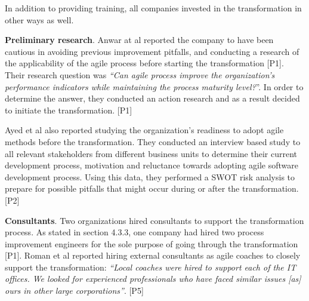 In addition to providing training, all companies invested in the
transformation in other ways as well.

{\bfseries Preliminary research}. Anwar at al reported the company
to have been cautious in avoiding previous improvement pitfalls,
and conducting a research of the applicability of the agile process
before starting the transformation [P1]. Their research question was
\textit{``Can agile process improve the organization's performance
indicators while maintaining the process maturity level?}''. In order to
determine the answer, they conducted an action research and as a result
decided to initiate the transformation. [P1]

Ayed et al also reported studying the organization's readiness to adopt
agile methods before the transformation. They conducted an interview
based study to all relevant stakeholders from different business
units to determine their current development process, motivation and
reluctance towards adopting agile software development process. Using
this data, they performed a SWOT risk analysis to prepare for possible
pitfalls that might occur during or after the transformation. [P2]

{\bfseries Consultants}. Two organizations hired consultants to support
the transformation process. As stated in section 4.3.3, one company had
hired two process improvement engineers for the sole purpose of going
through the transformation [P1]. Roman et al reported hiring external
consultants as agile coaches to closely support the transformation:
\textit{``Local coaches were hired to support each of the IT offices. We
looked for experienced professionals who have faced similar issues [as]
ours in other large corporations''}. [P5]
